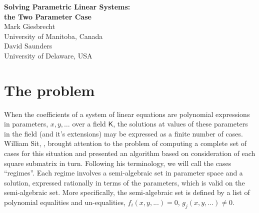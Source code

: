\setlength{\textwidth}{6.5in}
\setlength{\textheight}{9in}
\setlength{\oddsidemargin}{0pt}
\setlength{\evensidemargin}{0pt}
\setlength{\topmargin}{-.5in}



\begin{center}
\Large{\bf Solving Parametric Linear Systems:\\
the Two Parameter Case} \\[10pt]
Mark Giesbrecht\\
University of Manitoba, Canada\\
David Saunders \\
University of Delaware, USA \\
\end{center}

\newtheorem{theorem}{Theorem:}
\newcommand{\jog}{{$~$\indent$~$\indent$~$}}
\newcommand{\jogg}{{\jog\jog}}
\newcommand{\bc}{{$[$}}
\newcommand{\ec}{{$]$}}
\newcommand{\F}{{\mathsf F}}
\newcommand{\K}{{\mathsf K}}
\newcommand{\ints}{{\mathbf Z}}
\newcommand{\RR}{{\cal R}}
\newcommand{\Regime}{{\mbox{Regime}}}
\newcommand{\StPLS}{{SolveTwoParameterLinearSystem}}
\newcommand{\alg}{{\cal A}}
\newcommand{\breg}{\left\{\begin{array}{c}}
\newcommand{\ereg}{\end{array}\right\}}
\newcommand{\implies}{{~~\Rightarrow~~}}
\newcommand{\mxn}{{m\times n}}
\newcommand{\nxn}{{n\times n}}
\newcommand{\kxk}{{k\times k}}
\newcommand{\nx}[1]{{n\times #1}}
\newcommand{\mx}[1]{{m\times #1}}
\newcommand{\rx}[1]{{r\times #1}}
\newcommand{\for}{~\mbox{for}~}
\newcommand{\diag}{~\mbox{diag}~}
\newcommand{\sqfr}{~\mbox{sqfr}~}
\newcommand{\und}{~\mbox{and}~}
\newcommand{\given}{~\mbox{if}~}
\newcommand{\nequiv}{{\mskip4mu\not\equiv\mskip4mu}}
\def\nin{{\mathrel{\hbox{$\mskip4mu\not\in\mskip4mu$}}}}

\section{The problem}

When the coefficients of a system of linear equations are polynomial
expressions in parameters, $x, y, \ldots $ over a field $\K$, the solutions at values of
these parameters in the field (and it's extensions) may be expressed as a 
finite number of
cases.  William Sit, \cite{Sit}, brought attention to the problem of computing a complete set of cases for
this situation and presented an algorithm based on consideration of each square submatrix
in turn.  Following his terminology, we will call the cases  ``regimes''.  Each regime
involves a semi-algebraic set in parameter space and a solution, expressed
rationally in terms of the parameters, which is valid on the semi-algebraic set.
More specifically, the semi-algebraic set is defined by 
a list of polynomial equalities and un-equalities, 
$f_i(x,y, ...) = 0$, $g_j(x,y, ...) \ne 0$.

